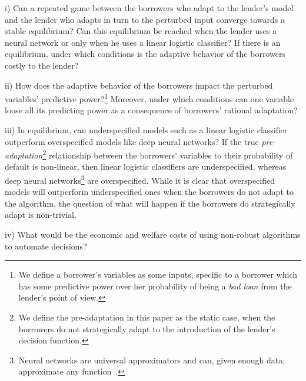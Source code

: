 \documentclass[12pt]{article} %
\begin{document}
i) Can a repeated game between the borrowers who adapt to the lender's model and the lender who adapts in turn to the perturbed input converge towards a stable equilibrium? Can this equilibrium be reached when the lender uses a neural network or only when he uses a linear logistic classifier? If there is an equilibrium, under which conditions is the adaptive behavior of the borrowers costly to the lender? 

ii) How does the adaptive behavior of the borrowers impact the perturbed variables' predictive power?\footnote{We define a borrower's variables as some inputs, specific to a borrower which has some predictive power over her probability of being a \textit{bad loan} from the lender's point of view.} Moreover, under which conditions can one variable loose all its predicting power as a consequence of borrowers' rational adaptation? 

iii) In equilibrium, can underspecified models such as a linear logistic classifier outperform overspecified models like deep neural networks? If the true \textit{pre-adaptation}\footnote{We define the pre-adaptation in this paper as the static case, when the borrowers do not strategically adapt to the introduction of the lender's decision function.} relationship between the borrowers' variables to their probability of default is non-linear, then linear logistic classifiers are underspecified, whereas deep neural networks\footnote{Neural networks are universal approximators and can, given enough data, approximate any 
function~\citep[see, e.g.,][]{hornik1989multilayer,hornik1991approximation}.} are overspecified. While it is clear that overspecified models will outperform underspecified ones when the borrowers do not adapt to the algorithm, the question of what will happen if the borrowers do strategically adapt is non-trivial. 
 
iv) What would be the economic and welfare costs of using non-robust algorithms to automate decisions? 
\end{document}
